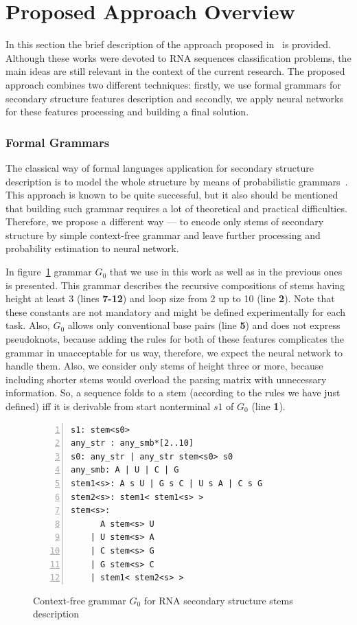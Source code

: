 \documentclass[runningheads]{llncs}
\begin{document}
\section{Proposed Approach Overview}
In this section the brief description of the approach proposed in~\cite{grigorevcomposition,lunina2019secondary} is provided. Although these works were devoted to RNA sequences classification problems, the main ideas are still relevant in the context of the current research. The proposed approach combines two different techniques: firstly, we use formal grammars for secondary structure features description and secondly, we apply neural networks for these features processing and building a final solution.

\subsubsection{Formal Grammars}
The classical way of formal languages application for secondary structure description is to model the whole structure by means of probabilistic grammars~\cite{knudsen2003pfold,nebel2011evaluation}. This approach is known to be quite successful, but it also should be mentioned that building such grammar requires a lot of theoretical and practical difficulties. Therefore, we propose a different way --- to encode only stems of secondary structure by simple context-free grammar and leave further processing and probability estimation to neural network. 

In figure~\ref{gram} grammar $G_0$ that we use in this work as well as in the previous ones is presented. This grammar describes the recursive compositions of stems having height at least 3 (lines \textbf{7-12}) and loop size from 2 up to 10 (line \textbf{2}). Note that these constants are not mandatory and might be defined experimentally for each task. Also, $G_0$ allows only conventional base pairs (line \textbf{5}) and does not express pseudoknots, because adding the rules for both of these features complicates the grammar in unacceptable for us way, therefore, we expect the neural network to handle them. Also, we consider only stems of height three or more, because including shorter stems would overload the parsing matrix with unnecessary information. So, a sequence folds to a stem (according to the rules we have just defined) iff it is derivable from start nonterminal $s1$ of $G_0$ (line \textbf{1}).

\begin{figure}[ht]
\begin{Verbatim}[numbers=left,xleftmargin=5mm]
s1: stem<s0>
any_str : any_smb*[2..10]
s0: any_str | any_str stem<s0> s0
any_smb: A | U | C | G
stem1<s>: A s U | G s C | U s A | C s G 
stem2<s>: stem1< stem1<s> >
stem<s>:  
      A stem<s> U 
    | U stem<s> A 
    | C stem<s> G 
    | G stem<s> C 
    | stem1< stem2<s> >  
\end{Verbatim}
\caption{Context-free grammar $G_0$ for RNA secondary structure stems description}
\label{gram}
\end{figure}
\end{document}
